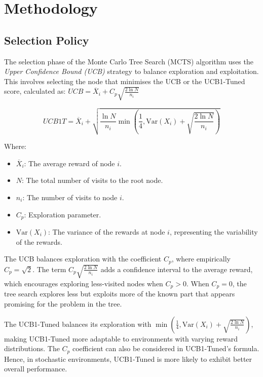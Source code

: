 \section{Methodology}

\subsection{Selection Policy}

The selection phase of the Monte Carlo Tree Search (MCTS) algorithm uses the \textit{Upper Confidence Bound (UCB)} strategy to balance exploration and exploitation. This involves selecting the node that minimises the UCB or the UCB1-Tuned score, calculated as: $UCB = \overline{X}_i + C_p \sqrt{\frac{2 \ln N}{n_i}}$

\begin{equation}
    UCB1T = \overline{X}_i + \sqrt{\frac{\ln N}{n_i} \min\left(\frac{1}{4}, \mathrm{Var}(X_i) + \sqrt{\frac{2 \ln N}{n_i}}\right)}
    \nonumber
\end{equation}

Where:
\begin{itemize}
    \item \( \overline{X}_i \): The average reward of node \( i \).
    \item \( N \): The total number of visits to the root node.
    \item \( n_i \): The number of visits to node \( i \).
    \item \( C_p \): Exploration parameter.
    \item \( \mathrm{Var}(X_i) \): The variance of the rewards at node \( i \), representing the variability of the rewards.
\end{itemize}

The UCB balances exploration with the coefficient $C_p$, where empirically $C_p = \sqrt{2}$. The term \( C_p \sqrt{\frac{2 \ln N}{n_i}} \) adds a confidence interval to the average reward, which encourages exploring less-visited nodes when $C_p > 0$. When $C_p = 0$, the tree search explores less but exploits more of the known part that appears promising for the problem in the tree.

The UCB1-Tuned balances its exploration with \( \min\left(\frac{1}{4}, \mathrm{Var}(X_i) + \sqrt{\frac{2 \ln N}{n_i}}\right) \), making UCB1-Tuned more adaptable to environments with varying reward distributions. The $C_p$ coefficient can also be considered in UCB1-Tuned's formula. Hence, in stochastic environments, UCB1-Tuned is more likely to exhibit better overall performance.

